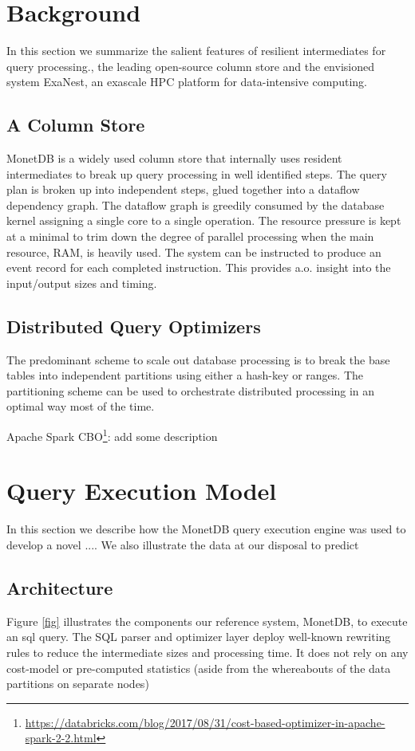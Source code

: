 \section{Background}
\label{Background}
In this section we summarize the salient features of resilient intermediates
for query processing., the leading open-source column store and the envisioned
system ExaNest, an exascale HPC platform for data-intensive computing.

\subsection{A Column Store}
MonetDB is a widely used column store that internally uses resident
intermediates to break up query processing in well identified steps.
The query plan is broken up into independent steps, glued together into a
dataflow dependency graph. The dataflow graph is greedily consumed by the
database kernel assigning a single core to a single operation.
The resource pressure is kept at a minimal to trim down the degree of parallel
processing when the main resource, RAM, is heavily used.
The system can be instructed to produce an event record for each completed instruction.
This provides a.o. insight into the input/output sizes and timing.

\subsection{Distributed Query Optimizers}
The predominant scheme to scale out database processing is to break the base
tables into independent partitions using either a hash-key or ranges.
The partitioning scheme can be used to orchestrate distributed processing
in an optimal way most of the time.

Apache Spark CBO\footnote{\url{https://databricks.com/blog/2017/08/31/cost-based-optimizer-in-apache-spark-2-2.html}}: add some description

\section{Query Execution Model}
In this section we describe how the MonetDB query execution engine was used
 to develop a novel .... We also illustrate the data at our disposal to predict

\subsection{Architecture}
Figure \ref{fig} illustrates the components our reference system, MonetDB,
to execute an sql query. The SQL parser and optimizer layer deploy well-known
rewriting rules to reduce the intermediate sizes and processing time.
It does not rely on any cost-model or pre-computed statistics
(aside from the whereabouts of the data partitions on separate nodes)

